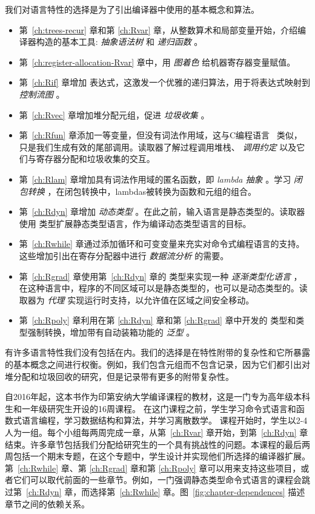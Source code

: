 \documentclass[11pt]{book}
\begin{document}
我们对语言特性的选择是为了引出编译器中使用的基本概念和算法。
\begin{itemize}
\item 第~\ref{ch:trees-recur} 章和第 \ref{ch:Rvar} 章，从整数算术和局部变量开始，介绍编译器构造的基本工具:  \emph{抽象语法树} 和 \emph{递归函数} 。
\item 第~\ref{ch:register-allocation-Rvar} 章中，用
  \emph{图着色} 给机器寄存器变量赋值。
\item 第~\ref{ch:Rif} 章增加  表达式，这激发一个优雅的递归算法，用于将表达式映射到
  \emph{控制流图} 。
\item 第~\ref{ch:Rvec} 章增加堆分配元组，促进
  \emph{垃圾收集} 。
\item 第~\ref{ch:Rfun} 章添加一等变量，但没有词法作用域，这与C编程语言~\citep{Kernighan:1988nx} 类似，只是我们生成有效的尾部调用。读取器了解过程调用堆栈、
  \emph{调用约定} 以及它们与寄存器分配和垃圾收集的交互。
\item 第~\ref{ch:Rlam} 章增加具有词法作用域的匿名函数，即 \emph{lambda 抽象} 。学习
  \emph{闭包转换} ，在闭包转换中，lambdas被转换为函数和元组的组合。
\item 第~\ref{ch:Rdyn} 章增加 \emph{动态类型} 。在此之前，输入语言是静态类型的。读取器使用  类型扩展静态类型语言，作为编译动态类型语言的目标。
\item 第~\ref{ch:Rwhile} 章通过添加循环和可变变量来充实对命令式编程语言的支持。这些增加引出在寄存分配器中进行 \emph{数据流分析} 的需要。
\item 第~\ref{ch:Rgrad} 章使用第~\ref{ch:Rdyn} 章的  类型来实现一种 \emph{逐渐类型化语言}
  ，在这种语言中，程序的不同区域可以是静态类型的，也可以是动态类型的。读取器为 \emph{代理} 实现运行时支持，以允许值在区域之间安全移动。
\item 第~\ref{ch:Rpoly} 章利用在第 \ref{ch:Rdyn} 章和第 \ref{ch:Rgrad} 章中开发的  类型和类型强制转换，增加带有自动装箱功能的 \emph{泛型} 。
\end{itemize}
有许多语言特性我们没有包括在内。我们的选择是在特性附带的复杂性和它所暴露的基本概念之间进行权衡。例如，我们包含元组而不包含记录，因为它们都引出对堆分配和垃圾回收的研究，但是记录带有更多的附带复杂性。

自2016年起，这本书作为印第安纳大学编译课程的教材，这是一门专为高年级本科生和一年级研究生开设的16周课程。
%
在这门课程之前，学生学习命令式语言和函数式语言编程，学习数据结构和算法，并学习离散数学。
%
课程开始时，学生以2-4人为一组。每个小组每两周完成一章，从第~\ref{ch:Rvar} 章开始，到第~\ref{ch:Rdyn} 章结束。许多章节包括我们分配给研究生的一个具有挑战性的问题。本课程的最后两周包括一个期末专题，在这个专题中，学生设计并实现他们所选择的编译器扩展。第~\ref{ch:Rwhile} 章、第 \ref{ch:Rgrad} 章和第
\ref{ch:Rpoly} 章可以用来支持这些项目，或者它们可以取代前面的一些章节。例如，一门强调静态类型命令式语言的课程会跳过第~\ref{ch:Rdyn} 章，而选择第~\ref{ch:Rwhile} 章。图~\ref{fig:chapter-dependences} 描述章节之间的依赖关系。
\end{document}
